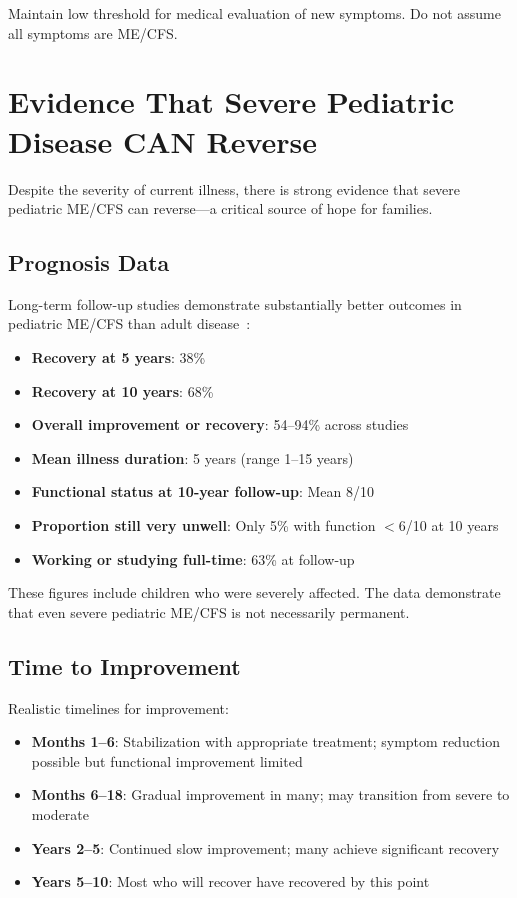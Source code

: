 Maintain low threshold for medical evaluation of new symptoms. Do not assume all symptoms are ME/CFS.

\section{Evidence That Severe Pediatric Disease CAN Reverse}
\label{sec:ped-severe-prognosis}

Despite the severity of current illness, there is strong evidence that severe pediatric ME/CFS can reverse---a critical source of hope for families.

\subsection{Prognosis Data}

Long-term follow-up studies demonstrate substantially better outcomes in pediatric ME/CFS than adult disease~\cite{Rowe2019pediatric}:

\begin{itemize}
    \item \textbf{Recovery at 5 years}: 38\%
    \item \textbf{Recovery at 10 years}: 68\%
    \item \textbf{Overall improvement or recovery}: 54--94\% across studies
    \item \textbf{Mean illness duration}: 5 years (range 1--15 years)
    \item \textbf{Functional status at 10-year follow-up}: Mean 8/10
    \item \textbf{Proportion still very unwell}: Only 5\% with function $<$6/10 at 10 years
    \item \textbf{Working or studying full-time}: 63\% at follow-up
\end{itemize}

These figures include children who were severely affected. The data demonstrate that even severe pediatric ME/CFS is not necessarily permanent.

\subsection{Time to Improvement}

Realistic timelines for improvement:
\begin{itemize}
    \item \textbf{Months 1--6}: Stabilization with appropriate treatment; symptom reduction possible but functional improvement limited
    \item \textbf{Months 6--18}: Gradual improvement in many; may transition from severe to moderate
    \item \textbf{Years 2--5}: Continued slow improvement; many achieve significant recovery
    \item \textbf{Years 5--10}: Most who will recover have recovered by this point
\end{itemize}

